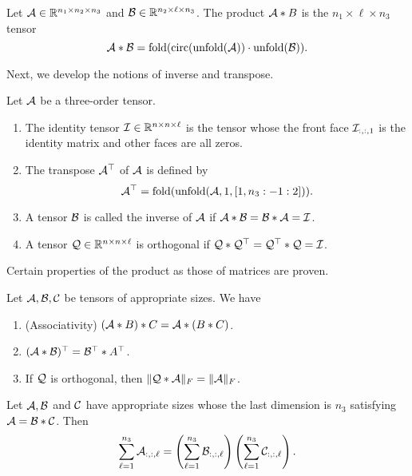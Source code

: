 \begin{definition}
    Let $\mathcal{A}\in{\mathbb{R}}^{n_1\times n_2\times n_3}$ and $\mathcal{B}\in{\mathbb{R}}^{n_2\times \ell\times n_3}$. The product $\mathcal{A}* B$ is the $n_1\times\ell\times n_3$ tensor
    \begin{equation}
        \mathcal{A}*\mathcal{B} = \mathrm{fold}(\mathrm{circ}(\mathrm{unfold}(\mathcal{A})) \cdot \mathrm{unfold}(\mathcal{B})).
    \end{equation}
\end{definition}

Next, we develop the notions of inverse and transpose.

\begin{definition}
    Let $\mathcal{A}$ be a three-order tensor.
    \begin{enumerate}
        \item The identity tensor $\mathcal{I}\in {\mathbb{R}}^{n\times n\times \ell}$ is the tensor whose the front face $\mathcal{I}_{:,:,1}$ is the identity matrix and other faces are all zeros.
        \item The transpose $\mathcal{A}^\top$ of $\mathcal{A}$ is defined by
              \begin{equation}
                  \mathcal{A}^\top = \mathrm{fold}(\mathrm{unfold}(\mathcal{A}, 1, [1, n_3:-1:2])).
              \end{equation}
        \item A tensor $\mathcal{B}$ is called the inverse of $\mathcal{A}$ if $\mathcal{A}* \mathcal{B} = \mathcal{B}* \mathcal{A} = \mathcal{I}$.
        \item A tensor $\mathcal{Q}\in{\mathbb{R}}^{n\times n\times \ell}$ is orthogonal if $\mathcal{Q}*\mathcal{Q}^\top = \mathcal{Q}^\top *\mathcal{Q} = \mathcal{I}$.
    \end{enumerate}

\end{definition}

Certain properties of the product as those of matrices are proven.

\begin{proposition}
    \label{proposition:properties}
    Let $\mathcal{A}, \mathcal{B}, \mathcal{C}$ be tensors of appropriate sizes. We have
    \begin{enumerate}
        \item (Associativity) $(\mathcal{A}* B)* C = \mathcal{A} * (B* C)$.
        \item $(\mathcal{A}*\mathcal{B})^\top = \mathcal{B}^\top * A^\top$.
        \item If $\mathcal{Q}$ is orthogonal, then $\|\mathcal{Q}*\mathcal{A}\|_F = \|\mathcal{A}\|_F$.
    \end{enumerate}
\end{proposition}

\begin{proposition}
    \label{proposition:sum}
    Let $\mathcal{A}, \mathcal{B}$ and $\mathcal{C}$ have appropriate sizes whose the last dimension is $n_3$ satisfying $\mathcal{A} = \mathcal{B}*\mathcal{C}$. Then
    \begin{equation}
        \sum\limits_{\ell=1}^{n_3}\mathcal{A}_{:,:,\ell} =  \left(\sum\limits_{\ell=1}^{n_3}\mathcal{B}_{:,:,\ell}\right)\left(\sum\limits_{\ell=1}^{n_3}\mathcal{C}_{:,:,\ell}\right).
    \end{equation}
\end{proposition}


